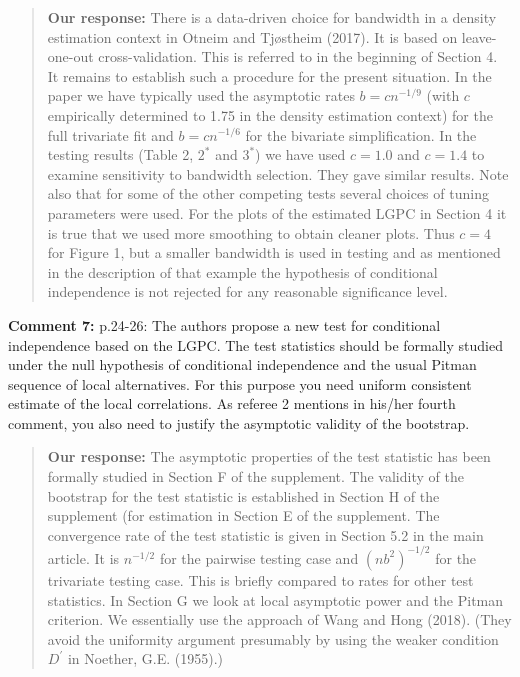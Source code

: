 \documentclass[
  12pt,
  letterpaper]{article}
\numberwithin{equation}{section}
\begin{document}
\begin{quote}
\textbf{Our response:} There is a data-driven choice for bandwidth in a density estimation context in Otneim and Tjøstheim (2017). It is based on leave-one-out cross-validation. This is referred to in the beginning of Section 4. It remains to establish such a procedure for the present situation. In the paper we have typically used the asymptotic rates \(b=cn^{-1/9}\) (with \(c\) empirically determined to 1.75 in the density estimation context) for the full trivariate fit and \(b=cn^{-1/6}\) for the bivariate simplification. In the testing results (Table 2, \(2^*\) and \(3^*\)) we have used \(c=1.0\) and \(c=1.4\) to examine sensitivity to bandwidth selection. They gave similar results. Note also that for some of the other competing tests several choices of tuning parameters were used. For the plots of the estimated LGPC in Section 4 it is true that we used more smoothing to obtain cleaner plots. Thus \(c=4\) for Figure 1, but a smaller bandwidth is used in testing and as mentioned in the description of that example the hypothesis of conditional independence is not rejected for any reasonable significance level.
\end{quote}

\textbf{Comment 7:} p.24-26: The authors propose a new test for conditional independence based on the LGPC. The test statistics should be formally studied under the null hypothesis of conditional independence and the usual Pitman sequence of local alternatives. For this purpose you need uniform consistent estimate of the local correlations. As referee 2 mentions in his/her fourth comment, you also need to justify the asymptotic validity of the bootstrap.

\begin{quote}
\textbf{Our response:} The asymptotic properties of the test statistic has been formally studied in Section F of the supplement. The validity of the bootstrap for the test statistic is established in Section H of the supplement (for estimation in Section E of the supplement. The convergence rate of the test statistic is given in Section 5.2 in the main article. It is \(n^{-1/2}\) for the pairwise testing case and \((nb^2)^{-1/2}\) for the trivariate testing case. This is briefly compared to rates for other test statistics. In Section G we look at local asymptotic power and the Pitman criterion. We essentially use the approach of Wang and Hong (2018). (They avoid the uniformity argument presumably by using the weaker condition \(D^{\prime}\) in Noether, G.E. (1955).)
\end{quote}
\end{document}
